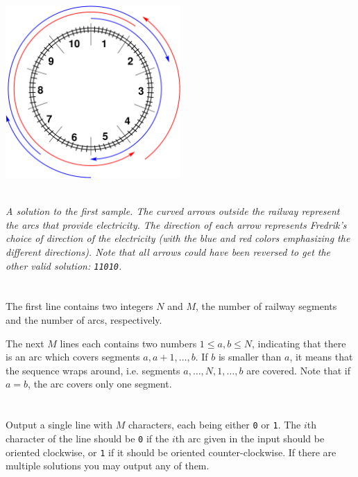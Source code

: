 \vspace{2mm}
\begin{center}
\includegraphics[width=0.5\textwidth]{alternatingfig.pdf}
\end{center}
\vspace{1mm} \\
{\em A solution to the first sample. The curved arrows outside the railway represent the arcs that provide electricity. The direction of each arrow represents Fredrik's choice of direction of the electricity (with the blue and red colors emphasizing the different directions). Note that all arrows could have been reversed to get the other valid solution: \texttt{11010}.}

\section*{}
The first line contains two integers $N$ and $M$, the number of railway segments and the number of arcs, respectively.

The next $M$ lines each contains two numbers $1 \le a, b \le N$, indicating that
there is an arc which covers segments $a, a+1, \dots, b$. If $b$ is smaller
than $a$, it means that the sequence wraps around, i.e. segments
$a, \dots, N, 1, \dots, b$ are covered. Note that if $a=b$, the arc covers only one segment.

\section*{\outputsection}
Output a single line with $M$ characters, each being either \texttt{0} or \texttt{1}. The $i$th character of the
line should be \texttt{0} if the $i$th arc given in the input should be oriented
clockwise, or \texttt{1} if it should be oriented counter-clockwise.
If there are multiple solutions you may output any of them.

